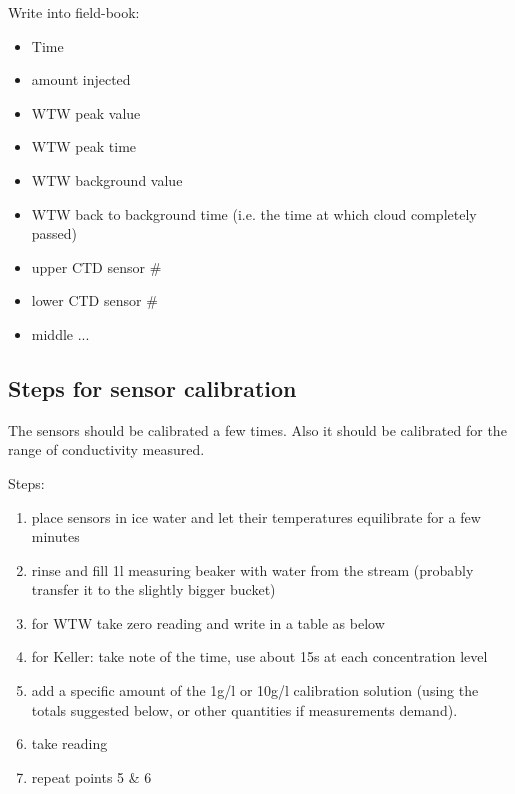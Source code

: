 \documentclass[DIV=15,halfparskip,11pt,headinclude]{scrartcl}
\begin{document}
Write into field-book:
\begin{itemize}
\item Time
  \item amount injected
\item WTW peak value
\item WTW peak time
\item WTW background value
\item WTW back to background time (i.e. the time at which cloud completely passed)
\item upper CTD sensor \#
\item lower CTD sensor \#
\item middle ...
\end{itemize}



\subsection{Steps for sensor calibration}
\label{sec-2-3}

The sensors should be calibrated a few times.  Also it should be
calibrated for the range of conductivity measured.

Steps:
\begin{enumerate}
\item place sensors in ice water and let their temperatures
  equilibrate for a few minutes
\item rinse and fill 1l measuring beaker with water from the stream (probably
  transfer it to the slightly bigger bucket)
\item for WTW take zero reading and write in a table as below
\item for Keller: take note of the time, use about 15s at each
  concentration level
\item add a specific amount of the 1g/l or 10g/l calibration solution (using
  the totals suggested below, or other quantities if measurements
  demand).
\item take reading
\item repeat points 5 \& 6
\end{enumerate}
\end{document}
